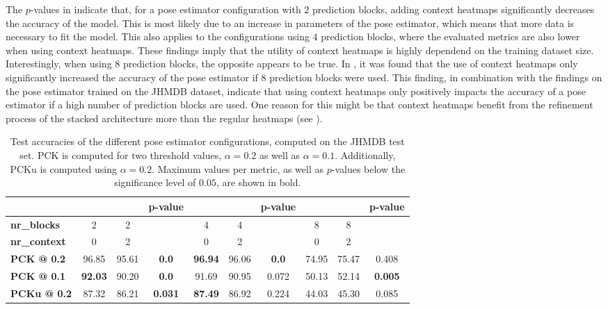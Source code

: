 The $p$-values in  indicate that, for a pose estimator configuration with $2$ prediction blocks, adding context heatmaps significantly decreases the accuracy of the model.
This is most likely due to an increase in parameters of the pose estimator, which means that more data is necessary to fit the model.
This also applies to the configurations using $4$ prediction blocks, where the evaluated metrics are also lower when using context heatmaps.
These findings imply that the utility of context heatmaps is highly dependend on the training dataset size.
Interestingly, when using $8$ prediction blocks, the opposite appears to be true.
In , it was found that the use of context heatmaps only significantly increased the accuracy of the pose estimator if $8$ prediction blocks were used.
This finding, in combination with the findings on the pose estimator trained on the JHMDB dataset, indicate that using context heatmaps only positively impacts the accuracy of a pose estimator if a high number of prediction blocks are used.
One reason for this might be that context heatmaps benefit from the refinement process of the stacked architecture more than the regular heatmaps (see ).  

\begin{table}[]
    \small
    \centering
    \begin{tabular}{|l|c|c|c||c|c|c||c|c|c|}
    \hline
        & & & \textbf{p-value} & & & \textbf{p-value} & & & \textbf{p-value} \\ \hline
        \textbf{nr\_blocks} & 2 & 2 &  & 4 & 4 &  & 8 & 8 &  \\ \hline
    \textbf{nr\_context} & 0 & 2 & & 0 & 2 & & 0 & 2 &\\ \hline
        \textbf{PCK @ 0.2} & 96.85 & 95.61 & \textbf{0.0} & \textbf{96.94} & 96.06 & \textbf{0.0} & 74.95 & 75.47 & 0.408 \\ \hline
        \textbf{PCK @ 0.1} & \textbf{92.03} & 90.20 & \textbf{0.0} & 91.69 & 90.95 & 0.072 & 50.13 & 52.14 & \textbf{0.005} \\ \hline
        \textbf{PCKu @ 0.2} & 87.32 & 86.21 & \textbf{0.031} & \textbf{87.49} & 86.92 &  0.224 & 44.03 & 45.30 & 0.085 \\ \hline
    \end{tabular}
    \caption{Test accuracies of the different pose estimator configurations, computed on the JHMDB test set. PCK is computed for two threshold values, $\alpha = 0.2$ as well as $\alpha = 0.1$. Additionally, PCKu is computed using $\alpha = 0.2$. Maximum values per metric, as well as $p$-values below the significance level of $0.05$, are shown in bold.}
    \label{tab:jhmdb_results}
\end{table}

